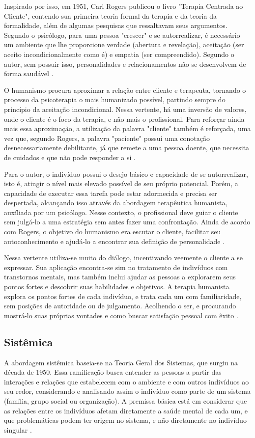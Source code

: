 Inspirado por isso, em 1951, Carl Rogers publicou o livro "Terapia Centrada ao Cliente", contendo sua primeira teoria formal da terapia e da teoria da formalidade, além de algumas pesquisas que ressaltavam seus argumentos. Segundo o psicólogo, para uma pessoa "crescer" e se autorrealizar, é necessário um ambiente que lhe proporcione verdade (abertura e revelação), aceitação (ser aceito incondicionalmente como é) e empatia (ser compreendido). Segundo o autor, sem possuir isso, personalidades e relacionamentos não se desenvolvem de forma saudável \cite{Pimenta2019}.

O humanismo procura aproximar a relação entre cliente e terapeuta, tornando o processo da psicoterapia o mais humanizado possível, partindo sempre do princípio da aceitação incondicional. Nessa vertente, há uma inversão de valores, onde o cliente é o foco da terapia, e não mais o profissional. Para reforçar ainda mais essa aproximação, a utilização da palavra "cliente" também é reforçada, uma vez que, segundo Rogers, a palavra "paciente" possui uma conotação desnecessariamente debilitante, já que remete a uma pessoa doente, que necessita de cuidados e que não pode responder a si \cite{Barros2022}.

Para o autor, o indivíduo possui o desejo básico e capacidade de se autorrealizar, isto é, atingir o nível mais elevado possível de seu próprio potencial. Porém, a capacidade de executar essa tarefa pode estar adormecida e precisa ser despertada, alcançando isso através da abordagem terapêutica humanista, auxíliada por um psicólogo. Nesse contexto, o profissional deve guiar o cliente sem julgá-lo a uma estratégia sem antes fazer uma confrontação. Ainda de acordo com Rogers, o objetivo do humanismo era escutar o cliente, facilitar seu autoconhecimento e ajudá-lo a encontrar sua definição de personalidade \cite{Pimenta2019}.

Nessa vertente utiliza-se muito do diálogo, incentivando veemente o cliente a se expressar. Sua aplicação encontra-se sim no tratamento de indivíduos com transtornos mentais, mas também inclui ajudar as pessoas a explorarem seus pontos fortes e descobrir suas habilidades e objetivos. A terapia humanista explora os pontos fortes de cada indivíduo, e trata cada um com familiaridade, sem posições de autoridade ou de julgamento. Acolhendo o ser, e procurando mostrá-lo suas próprias vontades e como buscar satisfação pessoal com êxito \cite{Brandao2023}.

\subsection{Sistêmica}
\label{sec:sistemica}
A abordagem sistêmica baseia-se na Teoria Geral dos Sistemas, que surgiu na década de 1950. Essa ramificação busca entender as pessoas a partir das interações e relações que estabelecem com o ambiente e com outros indivíduos ao seu redor, considerando e analisando assim o indivíduo como parte de um sistema (família, grupo social ou organização). A premissa básica está em considerar que as relações entre os indivíduos afetam diretamente a saúde mental de cada um, e que problemáticas podem ter origem no sistema, e não diretamente no indivíduo singular \cite{Verissimo2020}.

